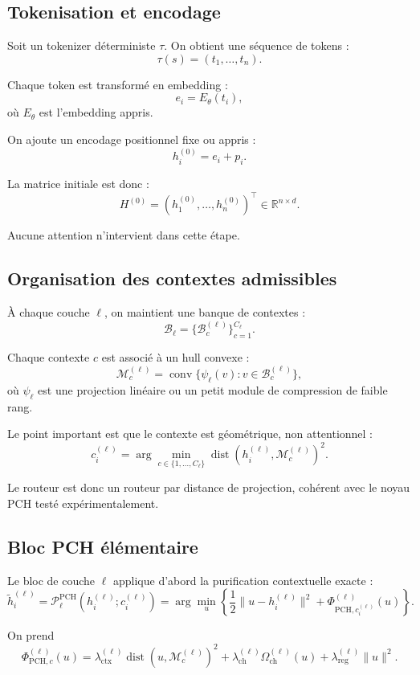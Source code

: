 \documentclass[11pt]{article}
\providecommand{\Ppch}{\mathcal P^{\mathrm{PCH}}}
\begin{document}
\subsection{Tokenisation et encodage}

Soit un tokenizer déterministe \(\tau\). On obtient une séquence de tokens :
\[
\tau(s) = (t_1,\dots,t_n).
\]

Chaque token est transformé en embedding :
\[
e_i = E_\theta(t_i),
\]
où \(E_\theta\) est l'embedding appris.

On ajoute un encodage positionnel fixe ou appris :
\[
h_i^{(0)} = e_i + p_i.
\]

La matrice initiale est donc :
\[
H^{(0)} = (h_1^{(0)},\dots,h_n^{(0)})^\top \in \mathbb R^{n\times d}.
\]

Aucune attention n'intervient dans cette étape.

\subsection{Organisation des contextes admissibles}

À chaque couche \(\ell\), on maintient une banque de contextes :
\[
\mathcal B_\ell = \{\mathcal B_c^{(\ell)}\}_{c=1}^{C_\ell}.
\]

Chaque contexte \(c\) est associé à un hull convexe :
\[
\mathcal M_c^{(\ell)} = \operatorname{conv}\{\psi_\ell(v): v\in \mathcal B_c^{(\ell)}\},
\]
où \(\psi_\ell\) est une projection linéaire ou un petit module de compression de faible rang.

Le point important est que le contexte est géométrique, non attentionnel :
\[
c_i^{(\ell)}
=
\arg\min_{c\in\{1,\dots,C_\ell\}}
\operatorname{dist}\!\left(h_i^{(\ell)}, \mathcal M_c^{(\ell)}\right)^2.
\]

Le routeur est donc un routeur par distance de projection, cohérent avec le noyau PCH testé expérimentalement.

\subsection{Bloc PCH élémentaire}

Le bloc de couche \(\ell\) applique d'abord la purification contextuelle exacte :
\[
\tilde h_i^{(\ell)}
=
\Ppch_\ell\!\left(h_i^{(\ell)};c_i^{(\ell)}\right)
=
\arg\min_u
\left\{
\frac12\|u-h_i^{(\ell)}\|^2
+
\Phi_{\mathrm{PCH},c_i^{(\ell)}}^{(\ell)}(u)
\right\}.
\]

On prend
\[
\Phi_{\mathrm{PCH},c}^{(\ell)}(u)
=
\lambda_{\mathrm{ctx}}^{(\ell)}\operatorname{dist}(u,\mathcal M_c^{(\ell)})^2
+
\lambda_{\mathrm{ch}}^{(\ell)}\Omega_{\mathrm{ch}}^{(\ell)}(u)
+
\lambda_{\mathrm{reg}}^{(\ell)}\|u\|^2.
\]
\end{document}
